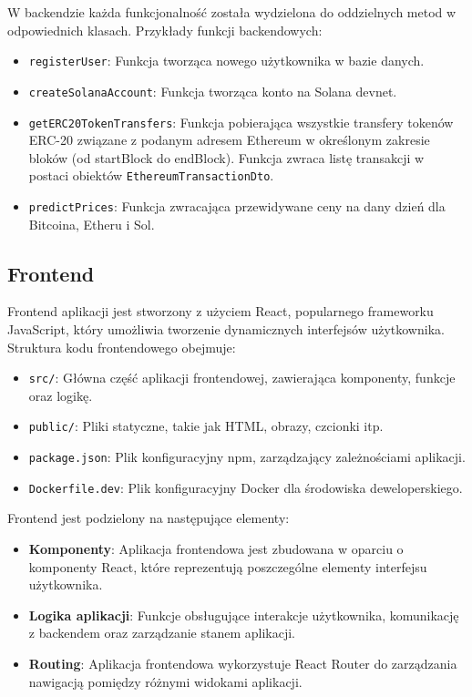 W backendzie każda funkcjonalność została wydzielona do oddzielnych metod w odpowiednich klasach. Przykłady funkcji backendowych:
\begin{itemize}
    \item \texttt{registerUser}: Funkcja tworząca nowego użytkownika w bazie danych.
    \item \texttt{createSolanaAccount}: Funkcja tworząca konto na Solana devnet.
    \item \texttt{getERC20TokenTransfers}: Funkcja pobierająca wszystkie transfery tokenów ERC-20 związane z podanym adresem Ethereum w określonym zakresie bloków (od startBlock do endBlock). Funkcja zwraca listę transakcji w postaci obiektów \texttt{EthereumTransactionDto}.
		\item \texttt{predictPrices}: Funkcja zwracająca przewidywane ceny na dany dzień dla Bitcoina, Etheru i Sol.
\end{itemize}


\subsection{Frontend}
Frontend aplikacji jest stworzony z użyciem React, popularnego frameworku JavaScript, który umożliwia tworzenie dynamicznych interfejsów użytkownika. Struktura kodu frontendowego obejmuje:
\begin{itemize}
    \item \texttt{src/}: Główna część aplikacji frontendowej, zawierająca komponenty, funkcje oraz logikę.
    \item \texttt{public/}: Pliki statyczne, takie jak HTML, obrazy, czcionki itp.
    \item \texttt{package.json}: Plik konfiguracyjny npm, zarządzający zależnościami aplikacji.
    \item \texttt{Dockerfile.dev}: Plik konfiguracyjny Docker dla środowiska deweloperskiego.
\end{itemize}

Frontend jest podzielony na następujące elementy:
\begin{itemize}
    \item \textbf{Komponenty}: Aplikacja frontendowa jest zbudowana w oparciu o komponenty React, które reprezentują poszczególne elementy interfejsu użytkownika.
    \item \textbf{Logika aplikacji}: Funkcje obsługujące interakcje użytkownika, komunikację z backendem oraz zarządzanie stanem aplikacji.
    \item \textbf{Routing}: Aplikacja frontendowa wykorzystuje React Router do zarządzania nawigacją pomiędzy różnymi widokami aplikacji.
\end{itemize}


